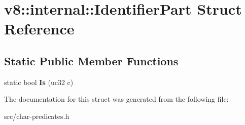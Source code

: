 \hypertarget{structv8_1_1internal_1_1_identifier_part}{}\section{v8\+:\+:internal\+:\+:Identifier\+Part Struct Reference}
\label{structv8_1_1internal_1_1_identifier_part}
\subsection*{Static Public Member Functions}
\begin{DoxyCompactItemize}
\item 
\hypertarget{structv8_1_1internal_1_1_identifier_part_aad25a6323106be19f2de741c31ba24a7}{}static bool {\bfseries Is} (uc32 c)\label{structv8_1_1internal_1_1_identifier_part_aad25a6323106be19f2de741c31ba24a7}

\end{DoxyCompactItemize}


The documentation for this struct was generated from the following file\+:\begin{DoxyCompactItemize}
\item 
src/char-\/predicates.\+h\end{DoxyCompactItemize}
